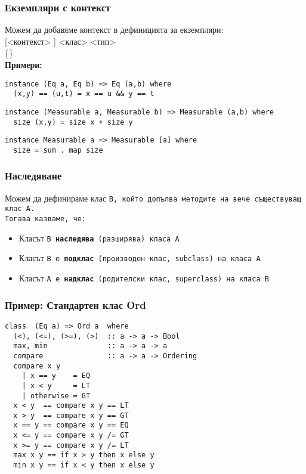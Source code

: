 \documentclass[alsotrans]{beamerswitch}
\begin{document}
\begin{frame}[fragile]
  \frametitle{Екземпляри с контекст}
  Можем да добавяме контекст в дефиницията за екземпляри:\\
   [<контекст> \tta{=>}] <клас> <тип> \\
  \hspace{2ex} \{<дефиниция-на-метод>\}\\[1em]
  \pause
  \textbf{Примери:}
\small
\begin{lstlisting}
instance (Eq a, Eq b) => Eq (a,b) where
  (x,y) == (u,t) = x == u && y == t
\end{lstlisting}
  \pause
\begin{lstlisting}
instance (Measurable a, Measurable b) => Measurable (a,b) where
  size (x,y) = size x + size y
\end{lstlisting}
  \pause
\begin{lstlisting}
instance Measurable a => Measurable [a] where
  size = sum . map size
\end{lstlisting}
\end{frame}

\begin{frame}[fragile]
  \frametitle{Наследяване}
  Можем да дефинираме клас \tt{B}, който допълва методите на вече съществуващ клас \tt{A}.\\
  Тогава казваме, че:
  \begin{itemize}[<+->]
  \item Класът \tt{B} \textbf{наследява} (разширява) класа \tt{A}
  \item Класът \tt{B} е \textbf{подклас} (производен клас, subclass) на класа \tt{A}
  \item Класът \tt{A} е \textbf{надклас} (родителски клас, superclass) на класа \tt{B}
  \end{itemize}
\end{frame}

\begin{frame}[fragile]
  \frametitle{Пример: Стандартен клас Ord}
\begin{lstlisting}
class  (Eq a) => Ord a  where
  (<), (<=), (>=), (>)  :: a -> a -> Bool
  max, min              :: a -> a -> a
  compare               :: a -> a -> Ordering
  compare x y
    | x == y    = EQ
    | x < y     = LT
    | otherwise = GT
  x < y  == compare x y == LT
  x > y  == compare x y == GT
  x == y == compare x y == EQ
  x <= y == compare x y /= GT
  x >= y == compare x y /= LT
  max x y == if x > y then x else y
  min x y == if x < y then x else y
\end{lstlisting}
\end{frame}
\end{document}
